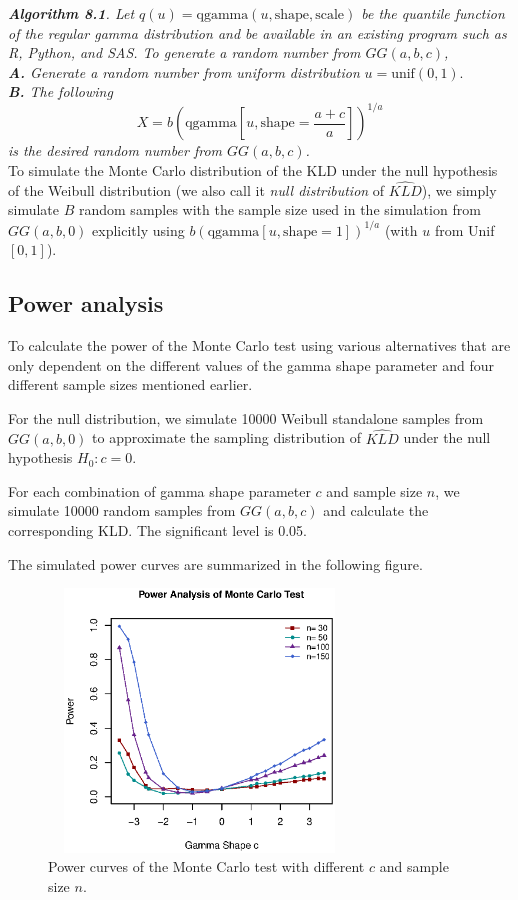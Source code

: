 \documentclass{ps}
\theoremstyle{plain}%
\theoremstyle{definition}
\theoremstyle{remark}
\begin{document}
\noindent \emph{{\bf Algorithm 8.1}. Let $q(u) = \mbox{qgamma}(u, \mbox{shape}, \mbox{scale})$ be the quantile function of the regular gamma distribution and be available in an existing program such as R, Python, and SAS. To generate a random number from $GG(a, b, c)$,}\\

\noindent \emph{{\bf A.} Generate a random number from uniform distribution} $u = \mbox{unif}(0,1)$.\\
\noindent \emph{{\bf B.} The following}
$$X = b\left(\mbox{qgamma}\left[ u, \mbox{shape}=\frac{a + c}{a}\right]\right)^{1/a}$$
\noindent \emph{is the desired random number from $GG(a, b, c)$.}\\

To simulate the Monte Carlo distribution of the KLD under the null hypothesis of the Weibull distribution (we also call it \emph{null distribution} of $\widehat{KLD}$), we simply simulate $B$ random samples with the sample size used in the simulation from $GG(a, b, 0)$ explicitly using $b\left(\mbox{qgamma}\left[ u, \mbox{shape}=1\right]\right)^{1/a}$ (with $u$ from Unif$[0,1]$). 


\subsection{Power analysis}\label{power-analysis}

To calculate the power of the Monte Carlo test using various alternatives that are only dependent on the different values of the gamma shape parameter and four different sample sizes mentioned earlier.

For the null distribution, we simulate 10000 Weibull standalone samples from $GG(a, b, 0)$ to approximate the sampling distribution of $\widehat{KLD}$ under the null hypothesis $H_0: c = 0$. 

For each combination of gamma shape parameter $c$ and sample size $n$, we simulate 10000 random samples from $GG(a, b, c)$ and calculate the corresponding KLD. The significant level is 0.05.

The simulated power curves are summarized in the following figure.

\begin{figure}[h!]
	\centering	\includegraphics[width=8cm,height=7cm]{Figure07_power_analysis.eps}
	\caption{Power curves of the Monte Carlo test with different $c$ and sample size $n$. }
	\label{Figure07_power_analysis}
\end{figure}
\end{document}
